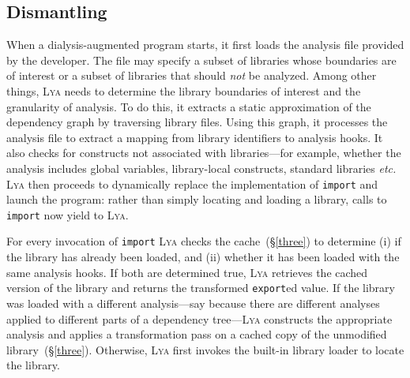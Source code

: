 \documentclass[letterpaper,twocolumn,10pt]{article}
\def\omit#1{}
\def\etc{{\em etc.}\xspace}
\newcommand{\ttt}[1]{\texttt{#1}}
\newcommand{\sx}[1]{(\S\ref{#1})}
\newcommand{\sys}{{\scshape Lya}\xspace}
\newcommand{\pc}{PIC\xspace}
\begin{document}

\subsection{Dismantling}
\label{one}

When a dialysis-augmented program starts, it first loads the analysis file provided by the developer. 
The file may specify a subset of libraries whose boundaries are of interest or a subset of libraries that should \emph{not} be analyzed.
Among other things, \sys needs to determine the library boundaries of interest and the granularity of analysis.
To do this, it extracts a static approximation of the dependency graph by traversing library files.
Using this graph, it processes the analysis file to extract a mapping from library identifiers to analysis hooks.
It also checks for constructs not associated with libraries---for example, whether the analysis includes global variables, library-local constructs, standard libraries \etc
\sys then proceeds to dynamically replace the implementation of \ttt{import} and launch the program:
  rather than simply locating and loading a library, calls to \ttt{import} now yield to \sys.

For every invocation of \ttt{import} \sys checks the cache~\sx{three} to determine
  (i) if the library has already been loaded, and
  (ii) whether it has been loaded with the same analysis hooks.
If both are determined true, \sys retrieves the cached version of the library and returns the transformed \ttt{export}ed value.
If the library was loaded with a different analysis---say because there are different analyses applied to different parts of a dependency tree---\sys constructs the appropriate analysis and applies a transformation pass on a cached copy of the unmodified library~\sx{three}.
Otherwise, \sys first invokes the built-in library loader to locate the library.
\end{document}
